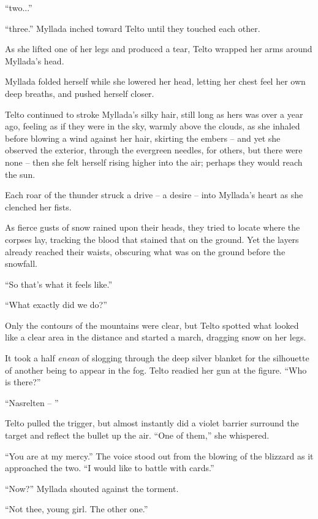 ``two...''

``three.'' Myllada inched toward Telto until they touched each other.

As she lifted one of her legs and produced a tear, Telto wrapped her arms around Myllada's head.

Myllada folded herself while she lowered her head, letting her chest feel her own deep breaths, and pushed herself closer.

Telto continued to stroke Myllada's silky hair, still long as hers was over a year ago, feeling as if they were in the sky, warmly above the clouds, as she inhaled before blowing a wind against her hair, skirting the embers -- and yet she observed the exterior, through the evergreen needles, for others, but there were none -- then she felt herself rising higher into the air; perhaps they would reach the sun.

\centeredstars

Each roar of the thunder struck a drive -- a desire -- into Myllada's heart as she clenched her fists.

As fierce gusts of snow rained upon their heads, they tried to locate where the corpses lay, tracking the blood that stained that on the ground. Yet the layers already reached their waists, obscuring what was on the ground before the snowfall.

``So that's what it feels like.''

``What exactly did we do?''

Only the contours of the mountains were clear, but Telto spotted what looked like a clear area in the distance and started a march, dragging snow on her legs.

\centeredstars

It took a half \emph{enean} of slogging through the deep silver blanket for the silhouette of another being to appear in the fog. Telto readied her gun at the figure. ``Who is there?''

``Nasrelten -- ''

Telto pulled the trigger, but almost instantly did a violet barrier surround the target and reflect the bullet up the air. ``One of them,'' she whispered.

``You are at my mercy.'' The voice stood out from the blowing of the blizzard as it approached the two. ``I would like to battle with cards.''

``Now?'' Myllada shouted against the torment.

``Not thee, young girl. The other one.''

